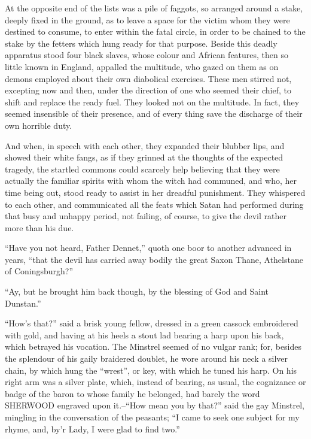At the opposite end of the lists was a pile of faggots, so arranged
around a stake, deeply fixed in the ground, as to leave a space for the
victim whom they were destined to consume, to enter within the fatal
circle, in order to be chained to the stake by the fetters which hung
ready for that purpose. Beside this deadly apparatus stood four black
slaves, whose colour and African features, then so little known in
England, appalled the multitude, who gazed on them as on demons employed
about their own diabolical exercises. These men stirred not, excepting
now and then, under the direction of one who seemed their chief, to
shift and replace the ready fuel. They looked not on the multitude. In
fact, they seemed insensible of their presence, and of every thing save
the discharge of their own horrible duty.

And when, in speech with each other, they expanded their blubber lips,
and showed their white fangs, as if they grinned at the thoughts of the
expected tragedy, the startled commons could scarcely help believing
that they were actually the familiar spirits with whom the witch had
communed, and who, her time being out, stood ready to assist in her
dreadful punishment. They whispered to each other, and communicated all
the feats which Satan had performed during that busy and unhappy period,
not failing, of course, to give the devil rather more than his due.

``Have you not heard, Father Dennet,'' quoth one boor to another
advanced in years, ``that the devil has carried away bodily the great
Saxon Thane, Athelstane of Coningsburgh?''

``Ay, but he brought him back though, by the blessing of God and Saint
Dunstan.''

``How's that?'' said a brisk young fellow, dressed in a green cassock
embroidered with gold, and having at his heels a stout lad bearing a
harp upon his back, which betrayed his vocation. The Minstrel seemed of
no vulgar rank; for, besides the splendour of his gaily braidered
doublet, he wore around his neck a silver chain, by which hung the
``wrest'', or key, with which he tuned his harp. On his right arm was a
silver plate, which, instead of bearing, as usual, the cognizance or
badge of the baron to whose family he belonged, had barely the word
SHERWOOD engraved upon it.--``How mean you by that?'' said the gay
Minstrel, mingling in the conversation of the peasants; ``I came to seek
one subject for my rhyme, and, by'r Lady, I were glad to find two.''

